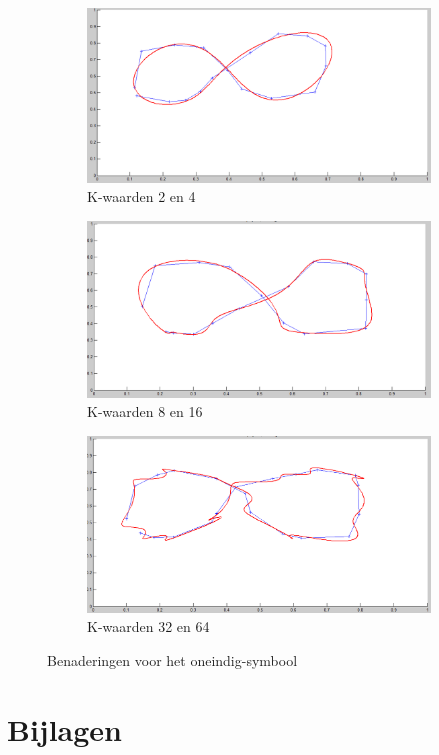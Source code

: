 \documentclass[a4paper, 12pt, titlepage]{report}
\begin{document}
\begin{figure}
\centering
\begin{subfigure}{.5\textwidth}
  \centering
  \includegraphics[width=\linewidth]{infsymbK4.png}
  \caption{K-waarden 2 en 4}
  \label{fig:infsub1}
\end{subfigure}%
\begin{subfigure}{.5\textwidth}
  \centering
  \includegraphics[width=\linewidth]{infsymbK8.png}
  \caption{K-waarden 8 en 16}
  \label{fig:infsub2}
\end{subfigure}
\begin{subfigure}{.5\textwidth}
  \centering
  \includegraphics[width=\linewidth]{infsymbK16.png}
  \caption{K-waarden 32 en 64}
  \label{fig:infsub3}
\end{subfigure}
\caption{Benaderingen voor het oneindig-symbool}
\label{fig:inf}
\end{figure}

\section{Bijlagen}



%




 
 
\end{document}
